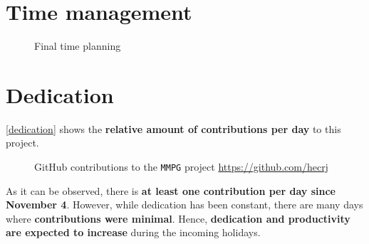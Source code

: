 \documentclass[a4paper,11pt,titlepage,abstract,numbers=noenddot,automark,mnsy,intlimits,rgb,dvipsnames]{report}
\begin{document}
\section{Time management}
\begin{figure}[H]
\caption{Final time planning}
\label{gantt_current}
\end{figure}
\section{Dedication}
\autoref{dedication} shows the \textbf{relative amount of contributions per day} to this project.
\begin{figure}[H]
\caption{GitHub contributions to the \texttt{MMPG} project \url{https://github.com/hecrj}}
\label{dedication}
\end{figure}
As it can be observed, there is \textbf{at least one contribution per day since November 4}. However, while dedication has
been constant, there are many days where \textbf{contributions were minimal}. Hence, \textbf{dedication and productivity are expected
to increase} during the incoming holidays.
\clearpage
\end{document}
